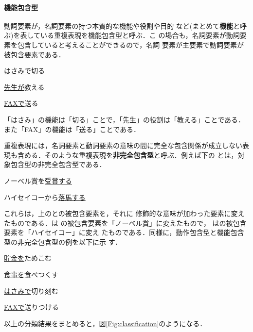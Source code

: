 \documentclass{nlp}
\begin{document}
\paragraph{機能包含型}動詞要素が，名詞要素の持つ本質的な機能や役割や目的
など(まとめて{\bf 機能}と呼ぶ)を表している重複表現を機能包含型と呼ぶ．こ
の場合も，名詞要素が動詞要素を包含していると考えることができるので，名詞
要素が主要素で動詞要素が被包含要素である．
\begin{EXAMPLE}
 \item \underline{はさみで}切る
 \item \underline{先生が}教える
 \item \underline{FAXで}送る
\end{EXAMPLE}
「はさみ」の機能は「切る」ことで，「先生」の役割は「教える」ことである．
また「FAX」の機能は「送る」ことである．

重複表現には，名詞要素と動詞要素の意味の間に完全な包含関係が成立しない表
現も含める．そのような重複表現を{\bf 非完全包含型}と呼ぶ．例えば下の
とは，対象包含型の非完全包含型である．
\begin{EXAMPLE}
 \item ノーベル賞を\underline{受賞する}      
 \item ハイセイコーから\underline{落馬する}  
\end{EXAMPLE}
これらは，上のとの被包含要素を，それに
修飾的な意味が加わった要素に変えたものである．は
の被包含要素を「ノーベル賞」に変えたもので，
はの被包含要素を「ハイセイコー」に変え
たものである．同様に，動作包含型と機能包含型の非完全包含型の例を以下に示
す．
\begin{EXAMPLE}
 \item \underline{貯金を}ためこむ
 \item \underline{食事を}食べつくす
\end{EXAMPLE}
\begin{EXAMPLE}
 \item \underline{はさみで}切り刻む
 \item \underline{FAXで}送りつける
\end{EXAMPLE}

\noindent
以上の分類結果をまとめると，図\ref{Fig:classification}のようになる．


\begin{figure*}[t]
 \begin{center}
  \caption{迂言表現と重複表現の分類}
  \label{Fig:classification}
 \end{center}
\end{figure*}
\end{document}
